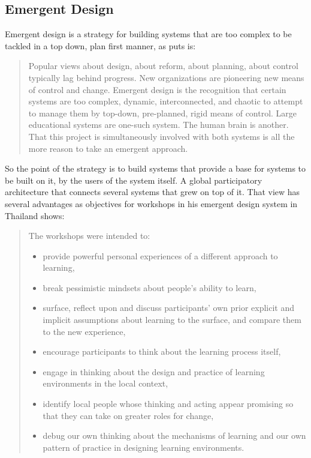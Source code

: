 \subsection{Emergent Design}

Emergent design is a strategy for building systems that are too complex to be
tackled in a top down, plan first manner, as
\cite{education:cavallo__technological_fluency} puts is:
\begin{quotation}
Popular views about design, about reform, about planning, about control
typically lag behind progress. New organizations are pioneering new means of
control and change.  Emergent design is the recognition that certain systems are
too complex, dynamic, interconnected, and chaotic to attempt to manage them by
top-down, pre-planned, rigid means of control. Large educational systems are
one-such system. The human brain is another.  That this project is
simultaneously involved with both systems is all the more reason to take an
emergent approach.
\end{quotation}

So the point of the strategy is to build systems that provide a base for systems
to be built on it, by the users of the system itself. A global participatory architecture
that connects several systems that grew on top of it. That view has several
advantages as \cite{education:cavallo__technological_fluency} objectives for workshops in his emergent design system in
Thailand shows:

\begin{quotation}
  The workshops were intended to:
    \begin{itemize}

        \item provide powerful personal experiences of a different approach to learning,

        \item break pessimistic mindsets about people’s ability to learn,

        \item surface, reflect upon and discuss participants’ own prior explicit and
        implicit assumptions about learning to the surface, and compare them to the new
        experience,

        \item encourage participants to think about the learning process itself,

        \item engage in thinking about the design and practice of learning environments
        in the local context,

        \item identify local people whose thinking and acting appear promising so that
        they can take on greater roles for change,

        \item debug our own thinking about the mechanisms of learning and our own
        pattern of practice in designing learning environments.  

    \end{itemize}
\end{quotation}
